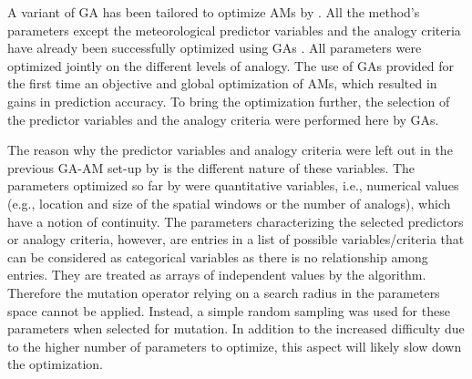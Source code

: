 \documentclass[draft]{agujournal2019}
\begin{document}
A variant of GA has been tailored to optimize AMs by . All the method's parameters except the meteorological predictor variables and the analogy criteria have already been successfully optimized using GAs \cite{Horton2018a}. All parameters were optimized jointly on the different levels of analogy. The use of GAs provided for the first time an objective and global optimization of AMs, which resulted in gains in prediction accuracy. To bring the optimization further, the selection of the predictor variables and the analogy criteria were performed here by GAs.

The reason why the predictor variables and analogy criteria were left out in the previous GA-AM set-up by  is the different nature of these variables. The parameters optimized so far by  were quantitative variables, i.e., numerical values (e.g., location and size of the spatial windows or the number of analogs), which have a notion of continuity. The parameters characterizing the selected predictors or analogy criteria, however, are entries in a list of possible variables/criteria that can be considered as categorical variables as there is no relationship among entries. They are treated as arrays of independent values by the algorithm. Therefore the mutation operator relying on a search radius in the parameters space \cite{Horton2017a} cannot be applied. Instead, a simple random sampling was used for these parameters when selected for mutation. In addition to the increased difficulty due to the higher number of parameters to optimize, this aspect will likely slow down the optimization.
\end{document}

